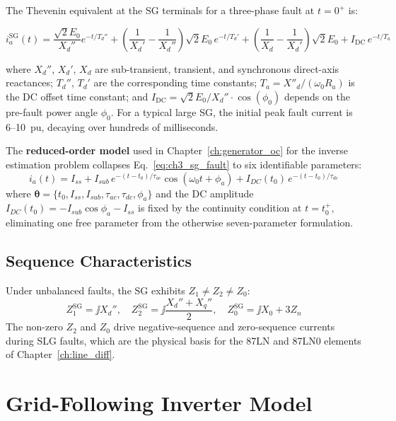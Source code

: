 The Thevenin equivalent at the SG terminals for a three-phase fault at $t=0^+$ is:

\begin{equation}
  i_a^\mathrm{SG}(t) =
    \frac{\sqrt{2} E_0}{X_d''} e^{-t/T_d''}
    + \left(\frac{1}{X_d'} - \frac{1}{X_d''}\right)\sqrt{2} E_0\, e^{-t/T_d'}
    + \left(\frac{1}{X_d} - \frac{1}{X_d'}\right)\sqrt{2} E_0
    + I_\mathrm{DC}\,e^{-t/T_a}
  \label{eq:ch3_sg_fault}
\end{equation}

where $X_d''$, $X_d'$, $X_d$ are sub-transient, transient, and synchronous
direct-axis reactances; $T_d''$, $T_d'$ are the corresponding time constants;
$T_a = X''_d / (\omega_0 R_a)$ is the DC offset time constant; and
$I_\mathrm{DC} = \sqrt{2} E_0 / X_d'' \cdot \cos(\phi_0)$ depends on the
pre-fault power angle $\phi_0$. For a typical large SG, the initial peak
fault current is 6--10~pu, decaying over hundreds of milliseconds.

The \textbf{reduced-order model} used in Chapter~\ref{ch:generator_oc}
for the inverse estimation problem collapses Eq.~\eqref{eq:ch3_sg_fault}
to six identifiable parameters:
\begin{equation}
  i_a(t) = I_{ss} + I_{sub}\,e^{-(t-t_0)/\tau_{ac}}\cos(\omega_0 t + \phi_a)
           + I_{DC}(t_0)\,e^{-(t-t_0)/\tau_{dc}}
  \label{eq:ch3_sg_reduced}
\end{equation}
where $\bm{\theta} = \{t_0, I_{ss}, I_{sub}, \tau_{ac}, \tau_{dc}, \phi_a\}$
and the DC amplitude $I_{DC}(t_0) = -I_{sub}\cos\phi_a - I_{ss}$
is fixed by the continuity condition at $t = t_0^+$, eliminating one
free parameter from the otherwise seven-parameter formulation.

\subsection{Sequence Characteristics}

Under unbalanced faults, the SG exhibits $Z_1 \neq Z_2 \neq Z_0$:
\begin{equation}
  Z_1^\mathrm{SG} = \jj X_d'', \quad
  Z_2^\mathrm{SG} = \jj \frac{X_d'' + X_q''}{2}, \quad
  Z_0^\mathrm{SG} = \jj X_0 + 3Z_n
  \label{eq:ch3_sg_seq_z}
\end{equation}
The non-zero $Z_2$ and $Z_0$ drive negative-sequence and zero-sequence
currents during SLG faults, which are the physical basis for the 87LN
and 87LN0 elements of Chapter~\ref{ch:line_diff}.

\section{Grid-Following Inverter Model}
\label{sec:ch3_gfl}

